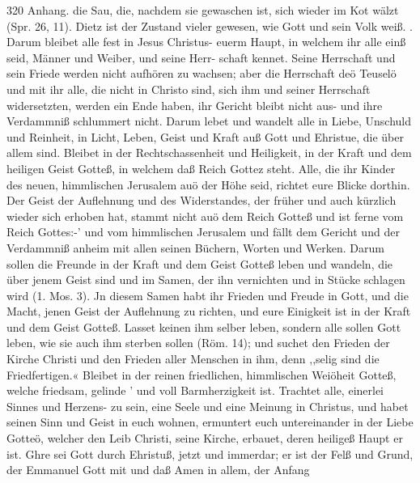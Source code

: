 320 Anhang.
die Sau, die, nachdem sie gewaschen ist, sich wieder im Kot
wälzt (Spr. 26, 11). Dietz ist der Zustand vieler gewesen, wie
Gott und sein Volk weiß. .
Darum bleibet alle fest in Jesus Christus- euerm Haupt, in
welchem ihr alle einß seid, Männer und Weiber, und seine Herr-
schaft kennet. Seine Herrschaft und sein Friede werden nicht
aufhören zu wachsen; aber die Herrschaft deö Teuselö und mit
ihr alle, die nicht in Christo sind, sich ihm und seiner Herrschaft
widersetzten, werden ein Ende haben, ihr Gericht bleibt nicht aus-
und ihre Verdammniß schlummert nicht. Darum lebet und
wandelt alle in Liebe, Unschuld und Reinheit, in Licht, Leben,
Geist und Kraft auß Gott und Ehristue, die über allem sind.
Bleibet in der Rechtschassenheit und Heiligkeit, in der Kraft und
dem heiligen Geist Gotteß, in welchem daß Reich Gottez steht.
Alle, die ihr Kinder des neuen, himmlischen Jerusalem auö der
Höhe seid, richtet eure Blicke dorthin.
Der Geist der Auflehnung und des Widerstandes, der früher
und auch kürzlich wieder sich erhoben hat, stammt nicht auö dem
Reich Gotteß und ist ferne vom Reich Gottes:-’ und vom himmlischen
Jerusalem und fällt dem Gericht und der Verdammniß anheim
mit allen seinen Büchern, Worten und Werken. Darum sollen
die Freunde in der Kraft und dem Geist Gotteß leben und wandeln,
die über jenem Geist sind und im Samen, der ihn vernichten und
in Stücke schlagen wird (1. Mos. 3). Jn diesem Samen habt ihr
Frieden und Freude in Gott, und die Macht, jenen Geist der
Auflehnung zu richten, und eure Einigkeit ist in der Kraft und
dem Geist Gotteß.
Lasset keinen ihm selber leben, sondern alle sollen Gott
leben, wie sie auch ihm sterben sollen (Röm. 14); und suchet den
Frieden der Kirche Christi und den Frieden aller Menschen in
ihm, denn ,,selig sind die Friedfertigen.« Bleibet in der reinen
friedlichen, himmlischen Weiöheit Gotteß, welche friedsam, gelinde
’ und voll Barmherzigkeit ist. Trachtet alle, einerlei Sinnes und
Herzens- zu sein, eine Seele und eine Meinung in Christus,
und habet seinen Sinn und Geist in euch wohnen, ermuntert
euch untereinander in der Liebe Gotteö, welcher den Leib Christi,
seine Kirche, erbauet, deren heiligeß Haupt er ist. Ghre sei Gott
durch Ehristuß, jetzt und immerdar; er ist der Felß und Grund,
der Emmanuel Gott mit und daß Amen in allem, der Anfang


